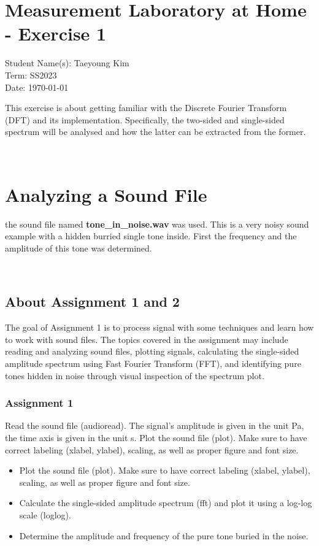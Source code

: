 \documentclass[
	a4paper,
	11pt,
]{article}
\begin{document}
\fancyhf{} %

\section*{Measurement Laboratory at Home - Exercise 1}
Student Name(s): Taeyoung Kim\\
Term: SS2023 \\
Date: \today


This exercise is about getting familiar with the Discrete Fourier Transform (DFT) and its implementation. Specifically, the two-sided and single-sided spectrum will be analysed and how the latter can be extracted from the former.

\\
\section{Analyzing a Sound File}
the sound file named \textbf{tone\_in\_noise.wav} was used. This is a very noisy sound example with a hidden burried single tone inside. First  the frequency and the amplitude of this tone was determined.

\\
\subsection{About Assignment 1 and 2}
The goal of Assignment 1 is to process signal with some techniques and learn how to work with sound files. The topics covered in the assignment may include reading and analyzing sound files, plotting signals, calculating the single-sided amplitude spectrum using Fast Fourier Transform (FFT), and identifying pure tones hidden in noise through visual inspection of the spectrum plot.
\\
\subsubsection{Assignment 1}
Read the sound file (audioread). The signal’s amplitude is given in the unit Pa, the time axis is given
in the unit s. Plot the sound file (plot). Make sure to have correct labeling (xlabel, ylabel), scaling, as well as
proper figure and font size.\\

\begin{itemize}
\item Plot the sound file (plot). Make sure to have correct labeling (xlabel, ylabel), scaling, as well as
proper figure and font size.
\item Calculate the single-sided amplitude spectrum (fft) and plot it using a log-log scale (loglog).
\item  Determine the amplitude and frequency of the pure tone buried in the noise.
\end{itemize}
\end{document}
